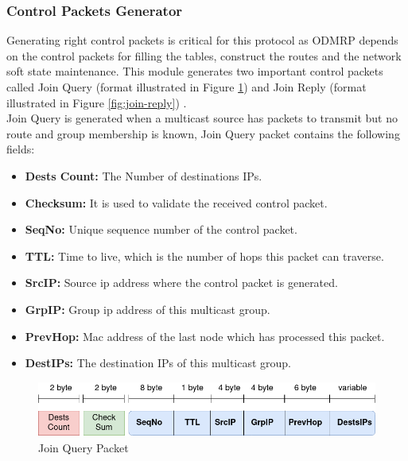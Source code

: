 \subsubsection{Control Packets Generator}
Generating right control packets is critical for this protocol as ODMRP depends on the control packets for filling the tables, construct the routes and the network soft state maintenance.
This module generates two important control packets called Join Query (format illustrated in Figure \ref{fig:join-query}) and Join Reply (format illustrated in Figure \ref{fig:join-reply}) .
\\
Join Query is generated when a multicast source has packets to transmit but no route and group membership is known, Join Query packet contains the following fields: 
\begin{itemize}[itemsep=1pt, topsep=5pt]
    \item \textbf{Dests Count:} The Number of destinations IPs.
    \item \textbf{Checksum:} It is used to validate the received control packet.
    \item \textbf{SeqNo:} Unique sequence number of the control packet.
    \item \textbf{TTL:} Time to live, which is the number of hops this packet can traverse.
    \item \textbf{SrcIP:} Source \acrshort{ip} address where the control packet is generated.
    \item \textbf{GrpIP:} Group \acrshort{ip} address of this multicast group.
    \item \textbf{PrevHop:} Mac address of the last node which has processed this packet.
    \item \textbf{DestIPs:} The destination IPs of this multicast group.
\end{itemize} 

\begin{figure}[!htbp]
    \centering
    \includegraphics[width=\linewidth]{images/join-query.png}
    \caption{Join Query Packet}
    \label{fig:join-query}
\end{figure}

